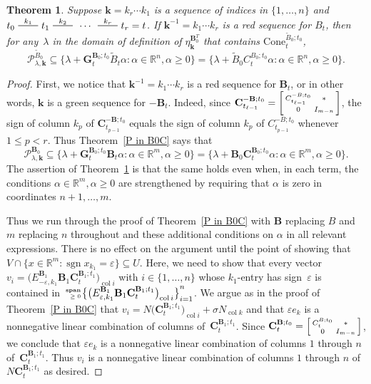 \documentclass{amsart}
\newtheorem{theorem}[proposition]{Theorem}
\theoremstyle{definition}
\theoremstyle{remark}
\numberwithin{equation}{section}
\newcommand{\reals}{\mathbb R}
\newcommand{\edge}{\,\,\rule[2.7pt]{20pt}{0.5pt}\,\,}
\newcommand{\ep}{\varepsilon}
\newcommand{\col}{\operatorname{col}}
\newcommand{\sgn}{\operatorname{sgn}}
\newcommand{\nnspan}{{\!\!\tiny\begin{array}{r}\mathbf{span}\\\ge0\end{array}\hspace*{-0.57em}}}
\newcommand{\set}[1]{{\lbrace #1 \rbrace}}
\newcommand{\sett}[1]{{\bigl\lbrace #1 \bigr\rbrace}}
\newcommand{\GG}{{\mathbf G}}
\newcommand{\CC}{{\mathbf C}}
\newcommand{\0}{{\mathbf{0}}}
\newcommand{\Cone}{\mathrm{Cone}}
\newcommand{\kk}{{\boldsymbol{k}}}
\newcommand{\tB}{{\widetilde{B}}}
\newcommand{\BB}{\mathbf{B}}
\renewcommand{\P}{\mathcal{P}}
\begin{document}
\begin{theorem}\label{P in B0C extended}
Suppose $\kk=k_r\cdots k_1$ is a sequence of indices in $\set{1,\ldots, n}$ and $t_0\overset{k_1}{\edge}t_1\overset{k_2}{\edge}\,\cdots\,\overset{k_r}{\edge}t_r=t$.
If $\kk^{-1}=k_1\cdots k_r$ is a red sequence for $B_t$, then for any~$\lambda$ in the domain of definition of $\eta_\kk^{\BB_0^T}$ that contains $\Cone^{\tB_0;t_0}_t$,
\[\P^{\tB_0}_{\lambda,\kk}\subseteq\set{\lambda+\GG_t^{\BB_0;t_0}\tB_t\alpha:\alpha\in\reals^n,\alpha\ge0}=\set{\lambda+\tB_0C_t^{B_0;t_0}\alpha:\alpha\in\reals^n,\alpha\ge0}.\]
\end{theorem}
\begin{proof}
First, we notice that $\kk^{-1}=k_1\cdots k_r$ is a red sequence for $\BB_t$, or in other words, $\kk$ is a green sequence for $-\BB_t$.
Indeed, since $\CC_{t_{\ell-1}}^{-\BB;t_0}=\begin{bsmallmatrix}C_{t_{\ell-1}}^{-B;t_0}&*\\0&I_{m-n}\end{bsmallmatrix}$, the sign of column $k_p$ of $\CC_{t_{p-1}}^{-\BB;t_0}$ equals the sign of column $k_p$ of $C_{t_{p-1}}^{-B;t_0}$ whenever $1\le p<r$.
Thus Theorem~\ref{P in B0C} says that
\[\P^{\BB_0}_{\lambda,\kk}\subseteq\set{\lambda+\GG_t^{\BB_0;t_0}\BB_t\alpha:\alpha\in\reals^m,\alpha\ge0}=\set{\lambda+\BB_0\CC_t^{\BB_0;t_0}\alpha:\alpha\in\reals^m,\alpha\ge0}.\]
The assertion of Theorem~\ref{P in B0C extended} is that the same holds even when, in each term, the conditions $\alpha\in\reals^m,\alpha\ge0$ are strengthened by requiring that $\alpha$ is zero in coordinates $n+1,\ldots,m$.

Thus we run through the proof of Theorem~\ref{P in B0C} with $\BB$ replacing $B$ and $m$ replacing $n$ throughout and these additional conditions on $\alpha$ in all relevant expressions.
There is no effect on the argument until the point of showing that $V\cap\set{x\in\reals^m:\sgn x_{k_1}=\ep}\subseteq U$.
Here, we need to show that every vector $v_i=\bigl(E^{\BB_1}_{-\ep,k_1}\BB_1\CC_t^{\BB_1;t_1}\bigr)_{\col i}$ with $i\in\set{1,\ldots,n}$ whose $k_1$-entry has sign~$\ep$ is contained in $\nnspan\sett{\bigl(E^{\BB_1}_{\ep,k_1}\BB_1\CC_t^{\BB_1;t_1}\bigr)_{\col i}}_{i=1}^n$.
We argue as in the proof of Theorem~\ref{P in B0C} that $v_i=N\bigl(\CC_t^{\BB_1;t_1}\bigr)_{\col i}+\sigma N_{\col k}$ and that $\ep e_k$ is a nonnegative linear combination of columns of~$\CC_t^{\BB_1;t_1}$.
Since $\CC_t^{\BB;t_0}=\begin{bsmallmatrix}C_t^{B;t_0}&*\\0&I_{m-n}\end{bsmallmatrix}$, we conclude that $\ep e_k$ is a nonnegative linear combination of columns $1$ through $n$ of~$\CC_t^{\BB_1;t_1}$.
Thus $v_i$ is a nonnegative linear combination of columns $1$ through $n$ of~$N\CC_t^{\BB_1;t_1}$ as desired.
\end{proof}
\end{document}
